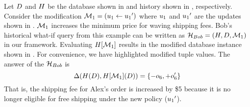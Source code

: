 \begin{exam}
\label{ex:change-prob-example}
Let $D$ and $H$ be the database shown in  and history shown in , respectively. Consider the modification $\mathcal{M}_1 = (u_1 \gets {u_1}')$ where $u_1$ and ${u_1}'$ are the updates shown in . $\mathcal{M}_1$ increases the minimum price for waving shipping fees. %
Bob's historical what-if query from this example can be written as $\mathcal{H}_{Bob} = (H, D, \mathcal{M}_1)$ in our framework.
Evaluating $H[\mathcal{M}_1]$ results in the modified database instance shown in . For convenience, we have highlighted modified tuple values. The answer of the \abbrHW $\mathcal{H}_{Bob}$ is
\[
  \Delta(H(D),H[\mathcal{M}_1](D)) = \{ -o_6, +o_6'\}
\]
%
That is, the shipping fee for Alex's order is increased by \$5 because it is no longer eligible for free shipping under the new policy (${u_1}'$).
\end{exam}

